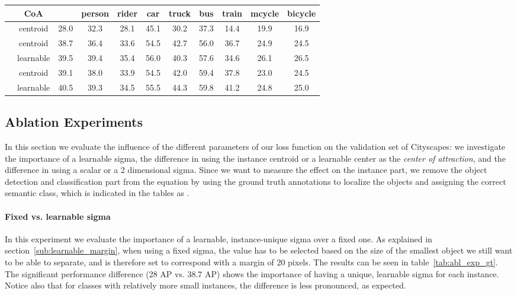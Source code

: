 \begin{table*}
    \small
    \centering
    \begin{tabular}{c|c|c|c c c c c c c c}
          & CoA &  & person & rider & car & truck & bus & train & mcycle & bicycle \\
        \hline
                 & centroid    & 28.0 & 32.3 & 28.1 & 45.1 & 30.2 & 37.3 & 14.4 & 19.9 & 16.9 \\
                          & centroid    & 38.7 & 36.4 & 33.6 & 54.5 & 42.7 & 56.0 & 36.7 & 24.9 & 24.5 \\
                          & learnable   & 39.5 & 39.4 & 35.4 & 56.0 & 40.3 & 57.6 & 34.6 & 26.1 & 26.5 \\
                   & centroid    & 39.1 & 38.0 & 33.9 & 54.5 & 42.0 & 59.4 & 37.8 & 23.0 & 24.5 \\
                   & learnable   & 40.5 & 39.3 & 34.5 & 55.5 & 44.3 & 59.8 & 41.2 & 24.8 & 25.0 \\
    \end{tabular}
    \vspace{3mm}
    \caption{Ablation experiments evaluated on the Cityscapes validation set using a ground-truth sampling approach. We measure the performance of a fixed sigma, the difference in using a scalar vs. 2-dimensional sigma and the difference in using the centroid or learnable center as \textit{center of attraction}.}
    \label{tab:abl_exp_gt}
\end{table*}

\subsection{Ablation Experiments}

In this section we evaluate the influence of the different parameters of our loss function on the validation set of Cityscapes: we investigate the importance of a learnable sigma, the difference in using the instance centroid or a learnable center as the \textit{center of attraction}, and the difference in using a scalar or a 2 dimensional sigma. Since we want to measure the effect on the instance part, we remove the object detection and classification part from the equation by using the ground truth annotations to localize the objects and assigning the correct semantic class, which is indicated in the tables as .

\paragraph{Fixed vs. learnable sigma}
In this experiment we evaluate the importance of a learnable, instance-unique sigma over a fixed one. As explained in section~\ref{sub:learnable_margin}, when using a fixed sigma, the value has to be selected based on the size of the smallest object we still want to be able to separate, and is therefore set to correspond with a margin of 20 pixels. The results can be seen in table~\ref{tab:abl_exp_gt}. The significant performance difference (28 AP vs. 38.7 AP) shows the importance of having a unique, learnable sigma for each instance. Notice also that for classes with relatively more small instances, the difference is less pronounced, as expected.


